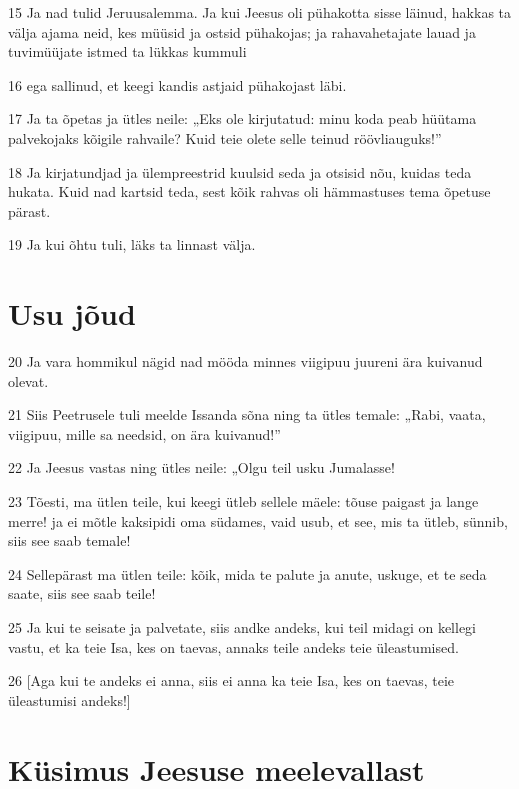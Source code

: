 \par 15 Ja nad tulid Jeruusalemma. Ja kui Jeesus oli pühakotta sisse läinud, hakkas ta välja ajama neid, kes müüsid ja ostsid pühakojas; ja rahavahetajate lauad ja tuvimüüjate istmed ta lükkas kummuli
\par 16 ega sallinud, et keegi kandis astjaid pühakojast läbi.
\par 17 Ja ta õpetas ja ütles neile: „Eks ole kirjutatud: minu koda peab hüütama palvekojaks kõigile rahvaile? Kuid teie olete selle teinud röövliauguks!”
\par 18 Ja kirjatundjad ja ülempreestrid kuulsid seda ja otsisid nõu, kuidas teda hukata. Kuid nad kartsid teda, sest kõik rahvas oli hämmastuses tema õpetuse pärast.
\par 19 Ja kui õhtu tuli, läks ta linnast välja.

\section*{Usu jõud}

\par 20 Ja vara hommikul nägid nad mööda minnes viigipuu juureni ära kuivanud olevat.
\par 21 Siis Peetrusele tuli meelde Issanda sõna ning ta ütles temale: „Rabi, vaata, viigipuu, mille sa needsid, on ära kuivanud!”
\par 22 Ja Jeesus vastas ning ütles neile: „Olgu teil usku Jumalasse!
\par 23 Tõesti, ma ütlen teile, kui keegi ütleb sellele mäele: tõuse paigast ja lange merre! ja ei mõtle kaksipidi oma südames, vaid usub, et see, mis ta ütleb, sünnib, siis see saab temale!
\par 24 Sellepärast ma ütlen teile: kõik, mida te palute ja anute, uskuge, et te seda saate, siis see saab teile!
\par 25 Ja kui te seisate ja palvetate, siis andke andeks, kui teil midagi on kellegi vastu, et ka teie Isa, kes on taevas, annaks teile andeks teie üleastumised.
\par 26 [Aga kui te andeks ei anna, siis ei anna ka teie Isa, kes on taevas, teie üleastumisi andeks!]

\section*{Küsimus Jeesuse meelevallast}

